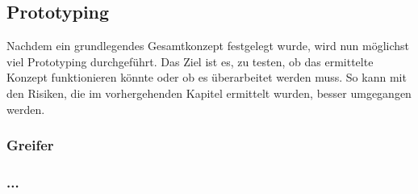 \subsection{Prototyping}

Nachdem ein grundlegendes Gesamtkonzept festgelegt wurde, wird nun möglichst viel Prototyping durchgeführt. Das Ziel ist es, zu testen, ob das ermittelte Konzept funktionieren könnte oder ob es überarbeitet werden muss. So kann mit den Risiken, die im vorhergehenden Kapitel ermittelt wurden, besser umgegangen werden.

\subsubsection{Greifer}

\subsubsection{...}


